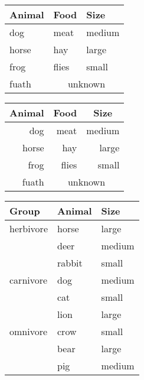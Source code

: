 \documentclass{article}
\begin{document}
\newpage

\begin{tabular}{lll}
  \toprule
  Animal & Food  & Size   \\
  \midrule
  dog    & meat  & medium \\
  horse  & hay   & large  \\
  frog   & flies & small  \\
  fuath  & \multicolumn{2}{c}{unknown} \\
  \bottomrule
\end{tabular}

\vspace{1cm}

\begin{tabular}{rrr}
  \toprule
  \multicolumn{1}{c}{Animal} & \multicolumn{1}{c}{Food} & \multicolumn{1}{c}{Size} \\
  \midrule
  dog    & meat  & medium \\
  horse  & hay   & large  \\
  frog   & flies & small  \\
  fuath  & \multicolumn{2}{c}{unknown} \\
  \bottomrule
\end{tabular}

\vspace{1cm}

\begin{tabular}{lll}
  \toprule
  Group     & Animal & Size   \\
  \midrule
  herbivore & horse  & large  \\
            & deer   & medium \\
            & rabbit & small  \\
  \addlinespace
  carnivore & dog    & medium \\
            & cat    & small  \\
            & lion   & large  \\
  \addlinespace
  omnivore  & crow   & small  \\
            & bear   & large  \\
            & pig    & medium \\
  \bottomrule
\end{tabular}

\end{document}
